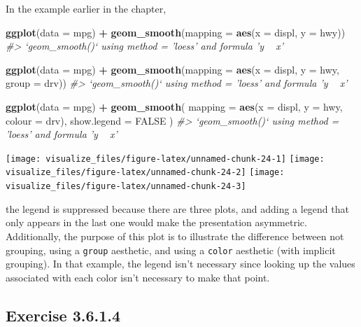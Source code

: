 \documentclass[]{book}
\newenvironment{Shaded}{\begin{snugshade}}{\end{snugshade}}
\newcommand{\CommentTok}[1]{\textcolor[rgb]{0.56,0.35,0.01}{\textit{#1}}}
\newcommand{\DataTypeTok}[1]{\textcolor[rgb]{0.13,0.29,0.53}{#1}}
\newcommand{\KeywordTok}[1]{\textcolor[rgb]{0.13,0.29,0.53}{\textbf{#1}}}
\newcommand{\NormalTok}[1]{#1}
\newcommand{\OperatorTok}[1]{\textcolor[rgb]{0.81,0.36,0.00}{\textbf{#1}}}
\newcommand{\OtherTok}[1]{\textcolor[rgb]{0.56,0.35,0.01}{#1}}
\newcommand{\StringTok}[1]{\textcolor[rgb]{0.31,0.60,0.02}{#1}}
\theoremstyle{plain}
\theoremstyle{remark}
\begin{document}
In the example earlier in the chapter,

\begin{Shaded}
\begin{Highlighting}[]
\KeywordTok{ggplot}\NormalTok{(}\DataTypeTok{data =}\NormalTok{ mpg) }\OperatorTok{+}
\StringTok{  }\KeywordTok{geom_smooth}\NormalTok{(}\DataTypeTok{mapping =} \KeywordTok{aes}\NormalTok{(}\DataTypeTok{x =}\NormalTok{ displ, }\DataTypeTok{y =}\NormalTok{ hwy))}
\CommentTok{#> `geom_smooth()` using method = 'loess' and formula 'y ~ x'}

\KeywordTok{ggplot}\NormalTok{(}\DataTypeTok{data =}\NormalTok{ mpg) }\OperatorTok{+}
\StringTok{  }\KeywordTok{geom_smooth}\NormalTok{(}\DataTypeTok{mapping =} \KeywordTok{aes}\NormalTok{(}\DataTypeTok{x =}\NormalTok{ displ, }\DataTypeTok{y =}\NormalTok{ hwy, }\DataTypeTok{group =}\NormalTok{ drv))}
\CommentTok{#> `geom_smooth()` using method = 'loess' and formula 'y ~ x'}

\KeywordTok{ggplot}\NormalTok{(}\DataTypeTok{data =}\NormalTok{ mpg) }\OperatorTok{+}
\StringTok{  }\KeywordTok{geom_smooth}\NormalTok{(}
    \DataTypeTok{mapping =} \KeywordTok{aes}\NormalTok{(}\DataTypeTok{x =}\NormalTok{ displ, }\DataTypeTok{y =}\NormalTok{ hwy, }\DataTypeTok{colour =}\NormalTok{ drv),}
    \DataTypeTok{show.legend =} \OtherTok{FALSE}
\NormalTok{  )}
\CommentTok{#> `geom_smooth()` using method = 'loess' and formula 'y ~ x'}
\end{Highlighting}
\end{Shaded}

\begin{center}\texttt{[image: visualize\_files/figure-latex/unnamed-chunk-24-1]} \texttt{[image: visualize\_files/figure-latex/unnamed-chunk-24-2]} \texttt{[image: visualize\_files/figure-latex/unnamed-chunk-24-3]} \end{center}

the legend is suppressed because there are three plots, and adding a legend that only appears in the last one would make the presentation asymmetric.
Additionally, the purpose of this plot is to illustrate the difference between not grouping, using a \texttt{group} aesthetic, and using a \texttt{color} aesthetic (with implicit grouping).
In that example, the legend isn't necessary since looking up the values associated with each color isn't necessary to make that point.

\hypertarget{exercise-3.6.1.4}{%
\subsection*{\texorpdfstring{Exercise {3.6.1.4}}{Exercise 3.6.1.4}}\label{exercise-3.6.1.4}}
\end{document}
